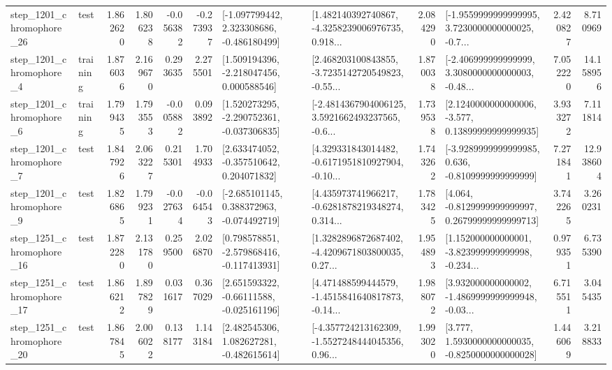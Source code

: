 \begin{tabular}{llrrrrllrlrr}
 step\_1201\_chromophore\_26 &      test &      1.862620 &    1.806238 &     -0.056382 & -0.273937 &   [-1.097799442, 2.323308686, -0.486180499] &  [1.482140392740867, -4.3258239006976735, 0.918... &       2.084290 &  [-1.9559999999999995, 3.7230000000000025, -0.7... &            2.420827 &          8.710969 \\
  step\_1201\_chromophore\_4 &  training &      1.876036 &    2.169670 &      0.293635 &  2.275501 &    [1.509194396, -2.218047456, 0.000588546] &  [2.468203100843855, -3.7235142720549823, -0.55... &       1.870038 &  [-2.406999999999999, 3.3080000000000003, -0.48... &            7.052220 &         14.158956 \\
  step\_1201\_chromophore\_6 &  training &      1.799435 &    1.793553 &     -0.005882 &  0.093892 &   [1.520273295, -2.290752361, -0.037306835] &  [-2.4814367904006125, 3.5921662493237565, -0.6... &       1.739538 &  [2.1240000000000006, -3.577, 0.13899999999999935] &            3.933272 &          7.111814 \\
  step\_1201\_chromophore\_7 &      test &      1.847926 &    2.063227 &      0.215301 &  1.704933 &    [2.633474052, -0.357510642, 0.204071832] &  [4.329331843014482, -0.6171951810927904, -0.10... &       1.743262 &  [-3.9289999999999985, 0.636, -0.8109999999999999] &            7.271841 &         12.938604 \\
  step\_1201\_chromophore\_9 &      test &      1.826865 &    1.799231 &     -0.027634 & -0.064543 &   [-2.685101145, 0.388372963, -0.074492719] &  [4.435973741966217, -0.6281878219348274, 0.314... &       1.783425 &  [4.064, -0.8129999999999997, 0.26799999999999713] &            3.742265 &          3.260231 \\
 step\_1251\_chromophore\_16 &      test &      1.872280 &    2.131780 &      0.259500 &  2.026870 &   [0.798578851, -2.579868416, -0.117413931] &  [1.3282896872687402, -4.4209671803800035, 0.27... &       1.954893 &  [1.152000000000001, -3.823999999999998, -0.234... &            0.979351 &          6.735390 \\
 step\_1251\_chromophore\_17 &      test &      1.866212 &    1.897829 &      0.031617 &  0.367029 &    [2.651593322, -0.66111588, -0.025161196] &  [4.471488599444579, -1.4515841640817873, -0.14... &       1.988072 &  [3.932000000000002, -1.4869999999999948, -0.03... &            6.715511 &          3.045435 \\
 step\_1251\_chromophore\_20 &      test &      1.867845 &    2.006022 &      0.138177 &  1.143184 &    [2.482545306, 1.082627281, -0.482615614] &  [-4.357724213162309, -1.5527248444045356, 0.96... &       1.993020 &   [3.777, 1.5930000000000035, -0.8250000000000028] &            1.446069 &          3.218833 \\

\end{tabular}
